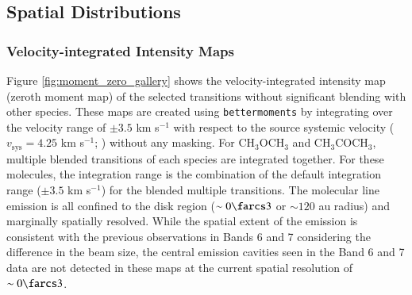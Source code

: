 \documentclass[linenumbers, twocolumn, twocolappendix, astrosymb, times]{aastex631}
\newcommand{\methanol}{CH$_3$OH\xspace}
\newcommand{\acetaldehyde}{CH$_3$CHO\xspace}
\newcommand{\methylformate}{CH$_3$OCHO\xspace}
\newcommand{\dimethylether}{CH$_3$OCH$_3$\xspace}
\newcommand{\acetone}{CH$_3$COCH$_3$\xspace}
\begin{document}




\subsection{Spatial Distributions}
\subsubsection{Velocity-integrated Intensity Maps}
Figure \ref{fig:moment_zero_gallery} shows the velocity-integrated intensity map (zeroth moment map) of the selected transitions without significant blending with other species. These maps are created using \texttt{bettermoments} \citep{bettermoments} by integrating over the velocity range of $\pm3.5$ km s$^{-1}$ with respect to the source systemic velocity ($v_\mathrm{sys} = 4.25$ km s$^{-1}$; \citealt{Tobin2023}) without any masking. For \dimethylether and \acetone, multiple blended transitions of each species are integrated together. For these molecules, the integration range is the combination of the default integration range ($\pm3.5$ km s$^{-1}$) for the blended multiple transitions. The molecular line emission is all confined to the disk region ($\sim0\farcs3$ or $\sim120$ au radius) and marginally spatially resolved. While the spatial extent of the emission is consistent with the previous observations in Bands 6 and 7 \citep{vantHoff2018, Lee2019, Tobin2023} considering the difference in the beam size, the central emission cavities seen in the Band 6 and 7 data are not detected in these maps at the current spatial resolution of $\sim0\farcs3$.
\end{document}
